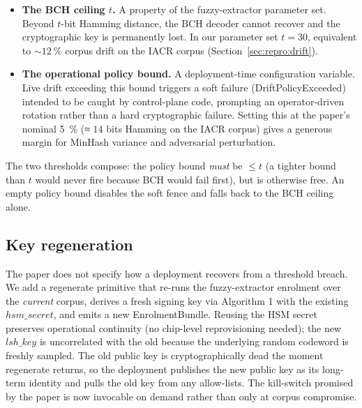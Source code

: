 \documentclass[11pt,a4paper]{article}
\begin{document}
\begin{itemize}
  \item \textbf{The BCH ceiling $t$.}  A property of the
        fuzzy\nobreakdash-extractor parameter set.  Beyond $t$\nobreakdash-bit
        Hamming distance, the BCH decoder cannot recover and the
        cryptographic key is permanently lost.  In our parameter
        set $t = 30$, equivalent to $\sim\!\SI{12}{\percent}$ corpus
        drift on the IACR corpus
        (Section~\ref{sec:repro:drift}).
  \item \textbf{The operational policy bound.}  A deployment-time
        configuration variable.  Live drift exceeding this
        bound triggers a soft failure
        (\textsf{DriftPolicyExceeded}) intended to be caught by
        control\nobreakdash-plane code, prompting an operator\nobreakdash-driven
        rotation rather than a hard cryptographic failure.  Setting
        this at the paper's nominal \SI{5}{\percent} (≈ $14$ bits
        Hamming on the IACR corpus) gives a generous margin for
        MinHash variance and adversarial perturbation.
\end{itemize}

The two thresholds compose: the policy bound \emph{must} be
$\leq t$ (a tighter bound than $t$ would never fire because BCH would
fail first), but is otherwise free.  An empty policy bound disables
the soft fence and falls back to the BCH ceiling alone.

\subsection{Key regeneration}
\label{sec:policy:regenerate}

The paper does not specify how a deployment recovers from a
threshold breach.  We add a \textsf{regenerate} primitive that
re\nobreakdash-runs the fuzzy\nobreakdash-extractor enrolment over the
\emph{current} corpus, derives a fresh signing key via Algorithm 1
with the existing $\mathit{hsm\_secret}$, and emits a new
\textsf{EnrolmentBundle}.  Reusing the HSM secret preserves
operational continuity (no chip\nobreakdash-level reprovisioning
needed); the new $\mathit{lsh\_key}$ is uncorrelated with the old
because the underlying random codeword is freshly sampled.  The
old public key is cryptographically dead the moment
\textsf{regenerate} returns, so the deployment publishes the new
public key as its long\nobreakdash-term identity and pulls the old key
from any allow\nobreakdash-lists.  The kill\nobreakdash-switch promised by
the paper is now invocable on demand rather than only at corpus
compromise.
\end{document}
